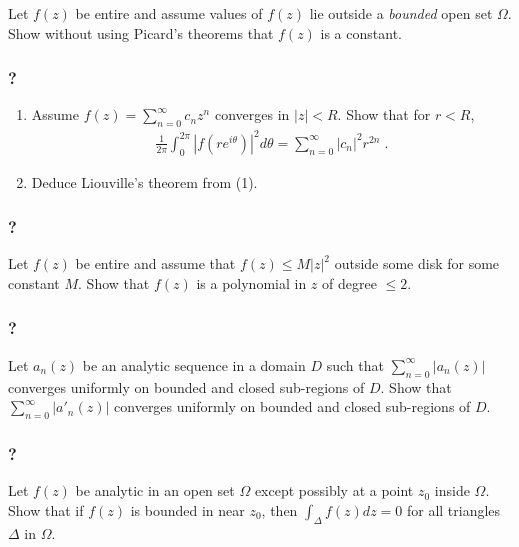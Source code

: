 Let \(f(z)\) be entire and assume values of \(f(z)\) lie outside a
\emph{bounded} open set \(\Omega\). Show without using Picard's theorems
that \(f(z)\) is a constant.

\hypertarget{section-100}{%
\subsubsection{?}\label{section-100}}

\begin{enumerate}
\def\labelenumi{(\arabic{enumi})}
\item
  Assume \(\displaystyle f(z) = \sum_{n=0}^\infty c_n z^n\) converges in
  \(|z| < R\). Show that for \(r <R\),
  \begin{align*}\frac{1}{2 \pi} \int_0^{2 \pi} |f(r e^{i \theta})|^2 d \theta
  = \sum_{n=0}^\infty |c_n|^2 r^{2n} \; .\end{align*}
\item
  Deduce Liouville's theorem from (1).
\end{enumerate}

\hypertarget{section-101}{%
\subsubsection{?}\label{section-101}}

Let \(f(z)\) be entire and assume that \(f(z) \leq M |z|^2\) outside
some disk for some constant \(M\). Show that \(f(z)\) is a polynomial in
\(z\) of degree \(\leq 2\).

\hypertarget{section-102}{%
\subsubsection{?}\label{section-102}}

Let \(a_n(z)\) be an analytic sequence in a domain \(D\) such that
\(\displaystyle \sum_{n=0}^\infty |a_n(z)|\) converges uniformly on
bounded and closed sub-regions of \(D\). Show that
\(\displaystyle \sum_{n=0}^\infty |a'_n(z)|\) converges uniformly on
bounded and closed sub-regions of \(D\).

\hypertarget{section-103}{%
\subsubsection{?}\label{section-103}}

Let \(f(z)\) be analytic in an open set \(\Omega\) except possibly at a
point \(z_0\) inside \(\Omega\). Show that if \(f(z)\) is bounded in
near \(z_0\), then \(\displaystyle \int_\Delta f(z) dz = 0\) for all
triangles \(\Delta\) in \(\Omega\).

